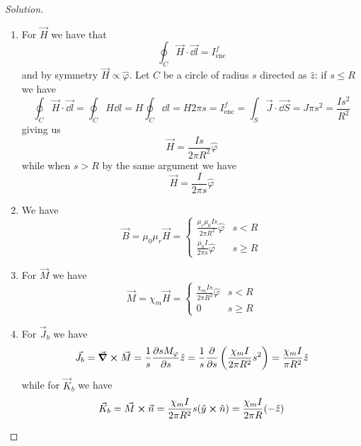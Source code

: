 \documentclass[12pt]{extarticle}
\begin{document}
\begin{proof}[Solution]

	\skiplineafterproof
	\begin{enumerate}
		\item
		      For $\vec H$ we have that
		      \begin{equation}
			      \oint_C \vec H \cdot \vec{\dd l} = I_\text{enc}^f
		      \end{equation}
		      and by symmetry $\vec H \propto \hat \varphi$.
		      Let $C$ be a circle of radius $s$ directed as $\hat z$: if $s \leq R$ we have
		      \begin{equation}
			      \oint_C \vec H \cdot \vec{\dd l} = \oint_C H \dd l = H \oint_C \dd l = H 2 \pi s = I_\text{enc}^f = \int_S \vec J \cdot \vec{\dd S} = J \pi s^2 = \frac{I s^2}{R^2}
		      \end{equation}
		      giving us
		      \begin{equation}
			      \vec H = \frac{Is}{2 \pi R^2} \hat \varphi
		      \end{equation}
		      while when $s > R$ by the same argument we have
		      \begin{equation}
			      \vec H = \frac{I}{2 \pi s} \hat \varphi
		      \end{equation}

		\item We have
		      \begin{equation}
			      \vec B = \mu_0 \mu_r \vec H = \begin{cases}
				      \frac{\mu_r \mu_0 Is}{2 \pi R^2} \hat \varphi & s < R    \\
				      \frac{\mu_0 I}{2 \pi s} \hat \varphi          & s \geq R
			      \end{cases}
		      \end{equation}

		\item For $\vec M$ we have
		      \begin{equation}
			      \vec M = \chi_m \vec H = \begin{cases}
				      \frac{\chi_m Is}{2 \pi R^2} \hat \varphi & s < R    \\
				      0                                        & s \geq R
			      \end{cases}
		      \end{equation}

		\item
		      For $\vec J_b$ we have
		      \begin{equation}
			      \vec J_b = \curl \vec M = \frac{1}{s} \pdv{s M_\varphi}{s} \hat z = \frac{1}{s} \pdv{s} \left( \frac{\chi_m I}{2 \pi R^2} s^2 \right) = \frac{\chi_m I}{\pi R^2} \hat z
		      \end{equation}
		      while for $\vec K_b$ we have
		      \begin{equation}
			      \vec K_b = \vec M \cross \vec n = \frac{\chi_m I}{2 \pi R^2} s (\hat y \cross \hat n) = \frac{\chi_m I}{2 \pi R}(- \hat z)
		      \end{equation}
	\end{enumerate}


\end{proof}
\end{document}
